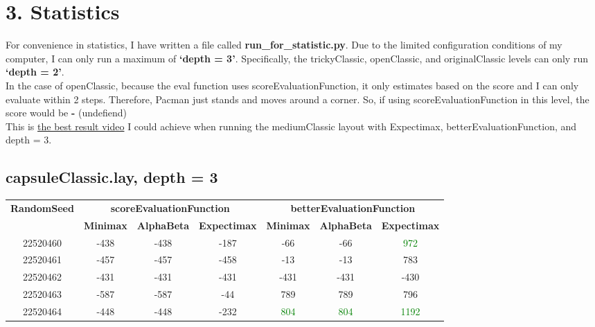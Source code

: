 \documentclass[english, a4paper,12pt]{article}
\begin{document}
\section*{3. Statistics}
\normalsize\hspace*{7mm}For convenience in statistics, I have written a file called \textbf{run\_for\_statistic.py}. Due to the limited configuration conditions of my computer, I can only run a maximum of \textbf{‘depth = 3’}. Specifically, the trickyClassic, openClassic, and originalClassic levels can only run \textbf{‘depth = 2’}.
\vspace*{3mm}\\
\normalsize\hspace*{7mm}In the case of openClassic, because the eval function uses scoreEvaluationFunction, it only estimates based on the score and I can only evaluate within 2 steps. Therefore, Pacman just stands and moves around a corner. So, if using scoreEvaluationFunction in this level, the score would be \textbf{-} (undefiend)
\vspace*{3mm}\\
\hspace*{7mm} This is \href{https://drive.google.com/file/d/1NlazYIF-0y74FMNw7oUwt-5tSI75wtdM/view?usp=sharing}{the best result video} I could achieve when running the mediumClassic layout with Expectimax, betterEvaluationFunction, and depth = 3.
\subsection*{capsuleClassic.lay, depth = 3}
\small\begin{tabular}{|c|c|c|c|c|c|c|}
\hline
{\textbf{RandomSeed}}& \multicolumn{3}{c|}{\textbf{scoreEvaluationFunction}} & \multicolumn{3}{c|}{\textbf{betterEvaluationFunction}} \\
\cline{2-7}
& \textbf{Minimax} & \textbf{AlphaBeta} & \textbf{Expectimax} & \textbf{Minimax} & \textbf{AlphaBeta} & \textbf{Expectimax} \\
\hline
22520460 & \textcolor{red!70}{-438}& \textcolor{red!70}{-438} & \textcolor{red!70}{-187} & \textcolor{red!70}{-66} & \textcolor{red!70}{-66} & \textcolor{Green}{972} \\
22520461 & \textcolor{red!70}{-457} & \textcolor{red!70}{-457} & \textcolor{red!70}{-458} & \textcolor{red!70}{-13} & \textcolor{red!70}{-13} & \textcolor{red!70}{783} \\
22520462 & \textcolor{red!70}{-431} & \textcolor{red!70}{-431} & \textcolor{red!70}{-431} & \textcolor{red!70}{-431} & \textcolor{red!70}{-431} & \textcolor{red!70}{-430} \\
22520463 & \textcolor{red!70}{-587} & \textcolor{red!70}{-587} & \textcolor{red!70}{-44} & \textcolor{red!70}{789} & \textcolor{red!70}{789} & \textcolor{red!70}{796} \\
22520464 & \textcolor{red!70}{-448} & \textcolor{red!70}{-448} & \textcolor{red!70}{-232} & \textcolor{Green}{804} & \textcolor{Green}{804} & \textcolor{Green}{1192} \\
\hline
\end{tabular}
\end{document}
